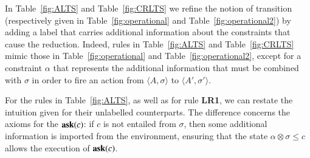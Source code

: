 \documentclass[preprint,12pt]{elsarticle}
\def\1{{\mathbf 1}}
\newcommand{\comment}[1]{}
\newcommand{\ask}{{\bf ask}}
\newcommand{\ostop}{{\bf stop}}
\newcommand{\rarrow}{\rightarrow}
\def\1{{\mathbf 1}}
\begin{document}

In Table~\ref{fig:ALTS} and Table~\ref{fig:CRLTS} we refine the notion of transition (respectively given in Table~\ref{fig:operational} and Table~\ref{fig:operational2})
by adding a label that carries additional information about the constraints that cause the reduction.
Indeed, rules in Table~\ref{fig:ALTS} and Table~\ref{fig:CRLTS} mimic those in Table~\ref{fig:operational} and Table~\ref{fig:operational2}, except for a constraint $\alpha$ that
represents the additional information that must be combined with $\sigma$ in order to fire an action
from $\langle A, \sigma\rangle$  to $\langle A', \sigma' \rangle$.

For the rules in Table~\ref{fig:ALTS}, as well as for rule {\bf  LR1}, we can restate the intuition given for their unlabelled counterparts. 
The difference concerns the axioms for the $\hbox{\ask}(c)$: if $c$ is not entailed from $\sigma$, then
some additional information  is imported from the environment, ensuring that the state
$\alpha \otimes \sigma \leq c$ allows the execution of $\hbox{\ask}(c)$.
\comment{The requirement $\alpha \leq \1$ ensures that the received information strengthens the store, 
	i.e., $\alpha \otimes \sigma \leq \sigma$.
	\todo{$\alpha \leq \1$ si pu\`o rimuovere}}
\end{document}
